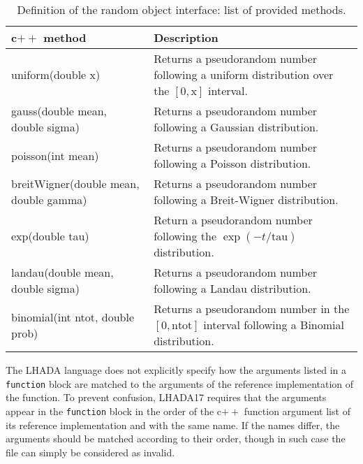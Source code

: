 \documentclass[11pt]{cernrep}
\begin{document}
 
\begin{table}
  \caption{Definition of the random object interface: list of provided methods. \label{tab:rand}}
  \begin{tabular}{l|p{20em}}
    c$++$ method & Description \\
    \hline
    uniform(double x)  & Returns a pseudorandom number following a uniform distribution over the $[0, \text{x}]$ interval.\\
    gauss(double mean, double sigma)    & Returns a pseudorandom number following a Gaussian distribution.\\
    poisson(int mean) & Returns a pseudorandom number following a Poisson distribution.\\
    breitWigner(double mean, double gamma) & Returns a pseudorandom number following a Breit-Wigner distribution. \\
    exp(double tau) & Return a pseudorandom number following the $\exp(-t/\text{tau})$ distribution. \\
    landau(double mean, double sigma) & Returns a pseudorandom number following a Landau distribution. \\
    binomial(int ntot, double prob) & Returns a pseudorandom number in the $[0, \text{ntot}]$ interval following a Binomial distribution.
  \end{tabular}
\end{table}


The {\sc LHADA} language does not explicitly specify how the arguments listed in a {\tt function} block are matched to the arguments of the reference implementation of the function. To prevent confusion, {\sc LHADA17} requires that the arguments appear in the {\tt function} block in the order of the c$++$ function argument list of its reference implementation and with the same name. If the names differ, the arguments should be matched according to their order, though in such case the file can simply be considered as invalid.
\end{document}
